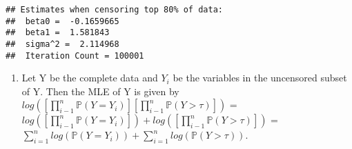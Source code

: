 \documentclass[
]{article}
\newenvironment{Shaded}{\begin{snugshade}}{\end{snugshade}}
\newcommand{\AttributeTok}[1]{\textcolor[rgb]{0.77,0.63,0.00}{#1}}
\newcommand{\CommentTok}[1]{\textcolor[rgb]{0.56,0.35,0.01}{\textit{#1}}}
\newcommand{\FloatTok}[1]{\textcolor[rgb]{0.00,0.00,0.81}{#1}}
\newcommand{\FunctionTok}[1]{\textcolor[rgb]{0.00,0.00,0.00}{#1}}
\newcommand{\NormalTok}[1]{#1}
\newcommand{\OtherTok}[1]{\textcolor[rgb]{0.56,0.35,0.01}{#1}}
\newcommand{\SpecialCharTok}[1]{\textcolor[rgb]{0.00,0.00,0.00}{#1}}
\newcommand{\StringTok}[1]{\textcolor[rgb]{0.31,0.60,0.02}{#1}}
\providecommand{\tightlist}{%
  \setlength{\itemsep}{0pt}\setlength{\parskip}{0pt}}
\begin{document}
\begin{Shaded}
\end{Shaded}

\begin{verbatim}
## Estimates when censoring top 80% of data: 
##  beta0 =  -0.1659665 
##  beta1 =  1.581843 
##  sigma^2 =  2.114968 
##  Iteration Count = 100001
\end{verbatim}

\begin{enumerate}
\def\labelenumi{\alph{enumi}.}
\setcounter{enumi}{3}
\tightlist
\item
  Let Y be the complete data and \(Y_i\) be the variables in the
  uncensored subset of Y. Then the MLE of Y is given by
  \(log([\prod_{i-1}^{n}\mathbb{P}(Y= Y_i)][\prod_{i-1}^{n}\mathbb{P}(Y > \tau)])\)
  =
  \(log([\prod_{i-1}^{n}\mathbb{P}(Y= Y_i)]) + log([\prod_{i-1}^{n}\mathbb{P}(Y > \tau)])\)
  =
  \(\sum_{i=1}^{n}log(\mathbb{P}(Y = Y_i)) + \sum_{i=1}^{n}log(\mathbb{P}(Y > \tau))\).
\end{enumerate}
\end{document}
